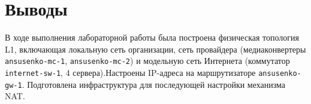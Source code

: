 \newpage
\section{Выводы}

В ходе выполнения лабораторной работы была построена физическая топология L1, включающая локальную сеть организации, сеть провайдера (медиаконвертеры \texttt{ansusenko-mc-1}, \texttt{ansusenko-mc-2}) и модельную сеть Интернета (коммутатор \texttt{internet-sw-1}, 4 сервера).Настроены IP-адреса на маршрутизаторе \texttt{ansusenko-gw-1}. Подготовлена инфраструктура для последующей настройки механизма NAT.



